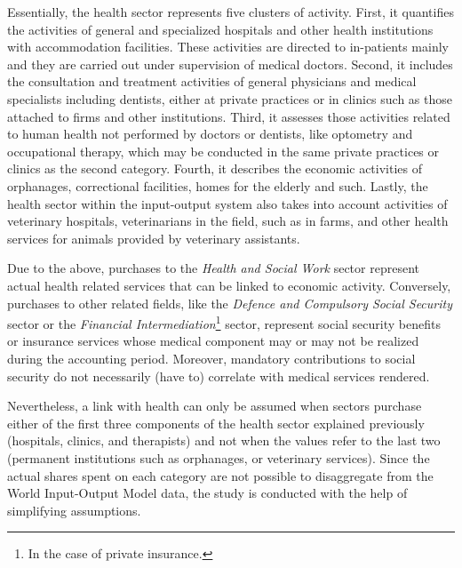 \documentclass[a4paper,12pt, ]{article}
\begin{document}
Essentially, the health sector represents five clusters of activity. First, it quantifies the activities of general and specialized hospitals and other health institutions with accommodation facilities. These activities are directed to in-patients mainly and they are carried out under supervision of medical doctors. Second, it includes the consultation and treatment activities of general physicians and medical specialists including dentists, either at private practices or in clinics such as those attached to firms and other institutions. Third, it assesses those activities related to human health not performed by doctors or dentists, like optometry and occupational therapy, which may be conducted in the same private practices or clinics as the second category. Fourth, it describes the economic activities of orphanages, correctional facilities, homes for the elderly and such. Lastly, the health sector within the input-output system also takes into account activities of veterinary hospitals, veterinarians in the field, such as in farms, and other health services for animals provided by veterinary assistants.


Due to the above, purchases to the \textit{Health and Social Work} sector represent actual health related services that can be linked to economic activity. Conversely, purchases to other related fields, like the \textit{Defence and Compulsory Social Security} sector or the \textit{Financial Intermediation}\footnote{In the case of private insurance.} sector, represent social security benefits or insurance services whose medical component may or may not be realized during the accounting period. Moreover, mandatory contributions to social security do not necessarily (have to) correlate with medical services rendered. 

Nevertheless, a link with health can only be assumed when sectors purchase either of the first three components of the health sector explained previously (hospitals, clinics, and therapists) and not when the values refer to the last two (permanent institutions such as orphanages, or veterinary services). Since the actual shares spent on each category are not possible to disaggregate from the World Input-Output Model data, the study is conducted with the help of simplifying assumptions.
\end{document}
